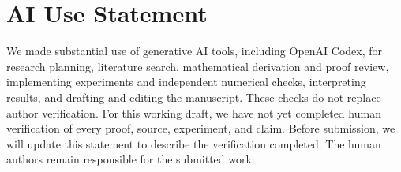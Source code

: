 \section*{AI Use Statement}

We made substantial use of generative AI tools, including OpenAI Codex, for
research planning, literature search, mathematical derivation and proof review,
implementing experiments and independent numerical checks, interpreting results,
and drafting and editing the manuscript. These checks do not replace author
verification. For this working draft, we have not yet completed human
verification of every proof, source, experiment, and claim. Before submission,
we will update this statement to describe the verification completed. The human
authors remain responsible for the submitted work.
